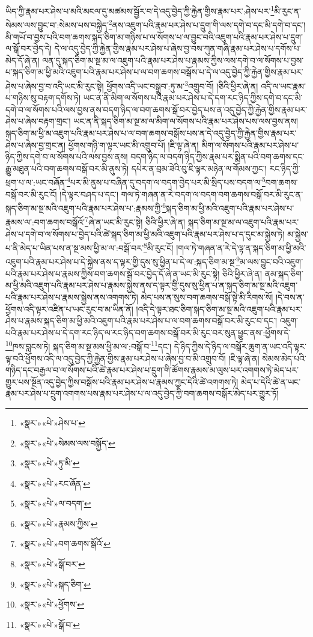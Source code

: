 ཡིད་ཀྱི་རྣམ་པར་ཤེས་པ་མའི་མངལ་དུ་མཚམས་སྦྱོར་བ་དེ་འདུ་བྱེད་ཀྱི་རྐྱེན་གྱིས་རྣམ་པར་:ཤེས་པར་\footnote{«སྣར་»«པེ་»ཤེས་པ་}མི་རུང་ན་སེམས་ལས་བྱུང་བ་:སེམས་པས་བསྐྱེད་\footnote{«སྣར་»«པེ་»སེམས་ལས་བསྐྱོད་}ནས་འཇུག་པའི་རྣམ་པར་ཤེས་པ་དྲུག་གི་ལས་དགེ་བ་དང་མི་དགེ་བ་དང་། མི་གཡོ་བ་བྱས་པའི་བག་ཆགས་སྐད་ཅིག་མ་གཉིས་པ་ལ་སོགས་པ་ལ་བྱུང་བའི་འཇུག་པའི་རྣམ་པར་ཤེས་པ་དྲུག་ལ་སྒོ་བར་བྱེད་དེ། དེ་ལ་འདུ་བྱེད་ཀྱི་རྐྱེན་གྱིས་རྣམ་པར་ཤེས་པ་ཞེས་བྱ་བས་ཀུན་གཞི་རྣམ་པར་ཤེས་པ་དགོས་པ་མེད་དོ་ཞེ་ན། ལན་དུ་སྐད་ཅིག་མ་སྔ་མ་ལ་འཇུག་པའི་རྣམ་པར་ཤེས་པ་རྣམས་ཀྱིས་ལས་དགེ་བ་ལ་སོགས་པ་བྱས་པ་སྐད་ཅིག་མ་ཕྱི་མའི་འཇུག་པའི་རྣམ་པར་ཤེས་པ་ལ་བག་ཆགས་བསྒོས་པ་དེ་ལ་འདུ་བྱེད་ཀྱི་རྐྱེན་གྱིས་རྣམ་པར་ཤེས་པ་ཞེས་བྱ་བ་འདི་ཡང་མི་རུང་སྟེ། ཕྱོགས་འདི་ཡང་བསྒྲུབ་:ཏུ་མ་\footnote{«སྣར་»«པེ་»ཏུ་མི་}འགྲུབ་བོ། །ཅིའི་ཕྱིར་ཞེ་ན། འདི་ལ་ཡང་རྣམ་པ་གཉིས་སུ་བརྟག་དགོས་ཏེ། ཡང་ན་ནི་མིག་ལ་སོགས་པའི་རྣམ་པར་ཤེས་པ་དེ་དག་རང་ཉིད་ཀྱིས་དགེ་བ་དང་མི་དགེ་བ་ལ་སོགས་པའི་ལས་བྱས་ནས་བདག་ཉིད་ལ་བག་ཆགས་སྒོ་བར་བྱེད་པས་ན་འདུ་བྱེད་ཀྱི་རྐྱེན་གྱིས་རྣམ་པར་ཤེས་པ་ཞེས་བརྟག་གྲང་། ཡང་ན་ནི་སྐད་ཅིག་མ་སྔ་མ་ལ་མིག་ལ་སོགས་པའི་རྣམ་པར་ཤེས་པས་ལས་བྱས་ནས། སྐད་ཅིག་མ་ཕྱི་མ་འཇུག་པའི་རྣམ་པར་ཤེས་པ་ལ་བག་ཆགས་བསྒོས་པས་ན་དེ་འདུ་བྱེད་ཀྱི་རྐྱེན་གྱིས་རྣམ་པར་ཤེས་པ་ཞེས་བྱ་གྲང་ན། ཕྱོགས་གཉི་ག་ལྟར་ཡང་མི་འགྲུབ་པོ། །ཇི་ལྟ་ཞེ་ན། མིག་ལ་སོགས་པའི་རྣམ་པར་ཤེས་པ་ཉིད་ཀྱིས་དགེ་བ་ལ་སོགས་པའི་ལས་བྱས་ནས། བདག་ཉིད་ལ་བདག་ཉིད་ཀྱིས་རྣམ་པར་སྨིན་པའི་བག་ཆགས་དང་རྒྱུ་མཐུན་པའི་བག་ཆགས་བསྒོ་བར་མི་ནུས་ཏེ། དཔེར་ན་བྲམ་ཟེའི་བུ་ཇི་ལྟར་མཉེན་ལ་གོམས་ཀྱང་། རང་ཉིད་ཀྱི་ཕྲག་པ་ལ་:ཡང་བཞོན་\footnote{«སྣར་»«པེ་»རང་ཞོན་}པར་མི་ནུས་པ་བཞིན་དུ་བདག་ལ་བདག་བྱེད་པར་མི་སྲིད་པས་བདག་ལ་\footnote{«སྣར་»«པེ་»ལ་བདག་}བག་ཆགས་བསྒོ་བར་མི་རུང་ངོ། །དེ་ལྟར་བཤད་པ་དང་། གལ་ཏེ་གཞན་ན་རེ་བདག་ལ་བདག་བག་ཆགས་བསྒོ་བར་མི་རུང་ན་སྐད་ཅིག་མ་སྔ་མའི་འཇུག་པའི་རྣམ་པར་ཤེས་པ་:རྣམས་ཀྱི་\footnote{«སྣར་»«པེ་»རྣམས་ཀྱིས་}སྐད་ཅིག་མ་ཕྱི་མའི་འཇུག་པའི་རྣམ་པར་ཤེས་པ་རྣམས་ལ་:བག་ཆགས་བསྒོའོ་\footnote{«སྣར་»«པེ་»བག་ཆགས་སྒོའོ་}ཞེ་ན་ཡང་མི་རུང་སྟེ། ཅིའི་ཕྱིར་ཞེ་ན། སྐད་ཅིག་མ་སྔ་མ་ལ་འཇུག་པའི་རྣམ་པར་ཤེས་པ་དགེ་བ་ལ་སོགས་པ་བྱེད་པའི་ཚེ་སྐད་ཅིག་མ་ཕྱི་མའི་འཇུག་པའི་རྣམ་པར་ཤེས་པ་ད་དུང་མ་སྐྱེས་ཏེ། མ་སྐྱེས་པ་ནི་མེད་པ་ཡིན་པས་ན་སྔ་མས་ཕྱི་མ་ལ་:བསྒོ་བར་\footnote{«སྣར་»«པེ་»སྒོ་བར་}མི་རུང་ངོ། །གལ་ཏེ་གཞན་ན་རེ་དེ་ལྟ་ན་སྐད་ཅིག་མ་ཕྱི་མའི་འཇུག་པའི་རྣམ་པར་ཤེས་པ་དེ་སྐྱེས་ནས་ད་ལྟར་གྱི་དུས་སུ་ཕྱིན་པ་དེ་ལ་:སྐད་ཅིག་མ་སྔ་\footnote{«སྣར་»«པེ་»སྐད་ཅིག་}མ་ལས་བྱུང་བའི་འཇུག་པའི་རྣམ་པར་ཤེས་པ་རྣམས་ཀྱིས་བག་ཆགས་སྒོ་བར་བྱེད་དོ་ཞེ་ན་ཡང་མི་རུང་སྟེ། ཅིའི་ཕྱིར་ཞེ་ན། ནམ་སྐད་ཅིག་མ་ཕྱི་མའི་འཇུག་པའི་རྣམ་པར་ཤེས་པ་རྣམས་སྐྱེས་ནས་ད་ལྟར་གྱི་དུས་སུ་ཕྱིན་པ་ན་སྐད་ཅིག་མ་སྔ་མའི་འཇུག་པའི་རྣམ་པར་ཤེས་པ་རྣམས་སྐྱེས་ནས་འགགས་ཏེ། མེད་པས་ན་སུས་བག་ཆགས་བསྒོ་སྟེ་མི་རིགས་སོ། །དེ་བས་ན་ཕྱོགས་འདི་ལྟར་འཛིན་པ་ཡང་རུང་བ་མ་ཡིན་ནོ། །འདི་དེ་ལྟར་ཐང་ཅིག་སྐད་ཅིག་མ་སྔ་མའི་འཇུག་པའི་རྣམ་པར་ཤེས་པ་རྣམས་སྐད་ཅིག་མ་ཕྱི་མའི་འཇུག་པའི་རྣམ་པར་ཤེས་པ་ལ་བག་ཆགས་བསྒོ་བར་མི་རུང་བ་དང་། འཇུག་པའི་རྣམ་པར་ཤེས་པ་དེ་དག་རང་ཉིད་ལ་རང་ཉིད་བག་ཆགས་བསྒོ་བར་མི་རུང་བར་སུན་ཕྱུང་ནས་:ཕྱོགས་དེ་\footnote{«སྣར་»«པེ་»ཕྱོགས་}ཁས་བླངས་ཏེ། སྐད་ཅིག་མ་སྔ་མས་ཕྱི་མ་ལ་:བསྒོ་བ་\footnote{«སྣར་»«པེ་»སྒོ་བ་}དང་། དེ་ཉིད་ཀྱིས་དེ་ཉིད་ལ་བསྒོར་ཆུག་ན་ཡང་འདི་ལྟར་ལྟ་བའི་ཕྱོགས་འདི་ལ་འདུ་བྱེད་ཀྱི་རྐྱེན་གྱིས་རྣམ་པར་ཤེས་པ་ཞེས་བྱ་བ་མི་འགྲུབ་བོ། །ཇི་ལྟ་ཞེ་ན། སེམས་མེད་པའི་གཉིད་དང་བརྒྱལ་བ་ལ་སོགས་པའི་ཚེ་རྣམ་པར་ཤེས་པ་དྲུག་གི་ཚོགས་རྣམས་མ་ལུས་པར་འགགས་ཏེ་མེད་པར་གྱུར་པས་སྔོན་འདུ་བྱེད་ཀྱིས་བསྒོས་པའི་རྣམ་པར་ཤེས་པ་རྣམས་ཀྱང་དེའི་ཚེ་འགགས་ཏེ། མེད་པ་དེའི་ཚེ་ན་ཡང་རྣམ་པར་ཤེས་པ་དྲུག་འགགས་པས་རྣམ་པར་ཤེས་པ་ལ་འདུ་བྱེད་ཀྱི་བག་ཆགས་བསྒོར་མེད་པར་གྱུར་ཏོ། 